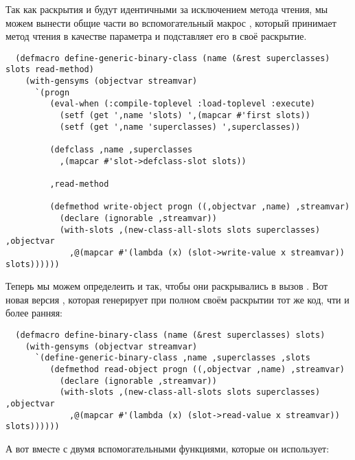 Так как раскрытия  и  будут
идентичными за исключением метода чтения, мы можем вынести общие части во вспомогательный
макрос , который принимает метод чтения в качестве
параметра и подставляет его в своё раскрытие.

\begin{lstlisting}
  (defmacro define-generic-binary-class (name (&rest superclasses) slots read-method)
    (with-gensyms (objectvar streamvar)
      `(progn
         (eval-when (:compile-toplevel :load-toplevel :execute)
           (setf (get ',name 'slots) ',(mapcar #'first slots))
           (setf (get ',name 'superclasses) ',superclasses))

         (defclass ,name ,superclasses
           ,(mapcar #'slot->defclass-slot slots))

         ,read-method

         (defmethod write-object progn ((,objectvar ,name) ,streamvar)
           (declare (ignorable ,streamvar))
           (with-slots ,(new-class-all-slots slots superclasses) ,objectvar
             ,@(mapcar #'(lambda (x) (slot->write-value x streamvar)) slots))))))
\end{lstlisting}

Теперь мы можем определеить  и  так, чтобы они раскрывались в вызов . Вот новая версия , которая генерирует при полном своём раскрытии тот же код, чти и более ранняя:

\begin{lstlisting}
  (defmacro define-binary-class (name (&rest superclasses) slots)
    (with-gensyms (objectvar streamvar)
      `(define-generic-binary-class ,name ,superclasses ,slots
         (defmethod read-object progn ((,objectvar ,name) ,streamvar)
           (declare (ignorable ,streamvar))
           (with-slots ,(new-class-all-slots slots superclasses) ,objectvar
             ,@(mapcar #'(lambda (x) (slot->read-value x streamvar)) slots))))))
\end{lstlisting}

А вот  вместе с двумя вспомогательными функциями, которые
он использует:

